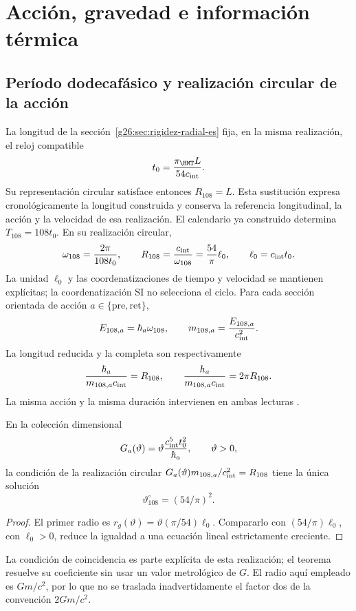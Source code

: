 \section{Acción, gravedad e información térmica}
\label{sec:gravity}
\subsection{Período dodecafásico y realización circular de la acción}
La longitud de la sección~\ref{g26:sec:rigidez-radial-es} fija, en
la misma realización, el reloj compatible
\[
 t_0=\frac{\pi_{\HMT}L}{54c_{\rm int}}.
\]
Su representación circular satisface entonces \(R_{108}=L\). Esta
sustitución expresa cronológicamente la longitud construida y conserva
la referencia longitudinal, la acción y la velocidad de esa realización.
El calendario ya construido determina $T_{108}=108t_0$.
En su realización circular,
\[
\omega_{108}=\frac{2\pi}{108t_0},\qquad
R_{108}=\frac{c_{\rm int}}{\omega_{108}}
=\frac{54}{\pi}\ell_0,\qquad \ell_0=c_{\rm int}t_0.
\]
La unidad $\ell_0$ y las coordenatizaciones de tiempo y velocidad se mantienen
explícitas; la coordenatización SI no selecciona el ciclo.
Para cada sección orientada de acción $a\in\{\mathrm{pre},\mathrm{ret}\}$,
\[
E_{108,a}=\hbar_a\omega_{108},\qquad
m_{108,a}=\frac{E_{108,a}}{c_{\rm int}^2}.
\]
La longitud reducida y la completa son respectivamente
\[
\frac{\hbar_a}{m_{108,a}c_{\rm int}}=R_{108},
\qquad
\frac{h_a}{m_{108,a}c_{\rm int}}=2\pi R_{108}.
\]
La misma acción y la misma duración intervienen en ambas lecturas
\cite{autodual}.

\begin{proposition}
En la colección dimensional
\[
G_a(\vartheta)=\vartheta\frac{c_{\rm int}^5t_0^2}{\hbar_a},
\qquad \vartheta>0,
\]
la condición de la realización circular
$G_a(\vartheta)m_{108,a}/c_{\rm int}^2=R_{108}$
tiene la única solución
\[
\vartheta^\circ_{108}=(54/\pi)^2.
\]
\end{proposition}
\begin{proof}
El primer radio es
$r_g(\vartheta)=\vartheta(\pi/54)\ell_0$.
Compararlo con $(54/\pi)\ell_0$, con $\ell_0>0$, reduce la
igualdad a una ecuación lineal estrictamente creciente.
\end{proof}
La condición de coincidencia es parte explícita de esta realización;
el teorema resuelve su coeficiente sin usar un valor metrológico de $G$.
El radio aquí empleado es $Gm/c^2$, por lo que no se traslada
inadvertidamente el factor dos de la convención $2Gm/c^2$.

